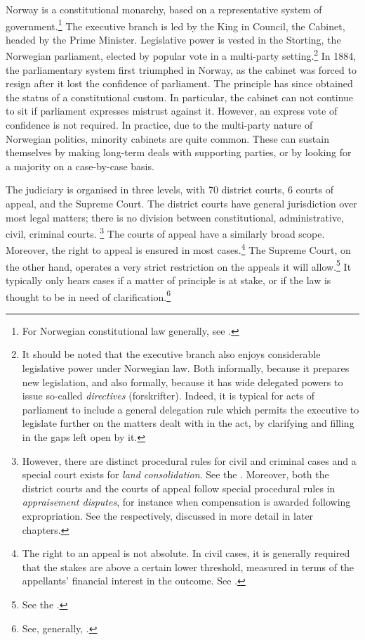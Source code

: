 Norway is a constitutional monarchy, based on a representative system of government.\footnote{For Norwegian constitutional law generally, see \cite{andenes06}.} The executive branch is led by the King in Council, the Cabinet, headed by the Prime Minister. Legislative power is vested in the Storting, the Norwegian parliament, elected by popular vote in a multi-party setting.\footnote{It should be noted that the executive branch also enjoys considerable legislative power under Norwegian law. Both informally, because it prepares new legislation, and also formally, because it has wide delegated powers to issue so-called {\it directives} (forskrifter). Indeed, it is typical for acts of parliament to include a general delegation rule which permits the executive to legislate further on the matters dealt with in the act, by clarifying and filling in the gaps left open by it.} In 1884, the parliamentary system first triumphed in Norway, as the cabinet was forced to resign after it lost the confidence of parliament. The principle has since obtained the status of a constitutional custom. In particular, the cabinet can not continue to sit if parliament expresses mistrust against it. However, an express vote of confidence is not required. In practice, due to the multi-party nature of Norwegian politics, minority cabinets are quite common. These can sustain themselves by making long-term deals with supporting parties, or by looking for a majority on a case-by-case basis.

The judiciary is organised in three levels, with 70 district courts, 6 courts of appeal, and the Supreme Court. The district courts have general jurisdiction over most legal matters; there is no division between constitutional, administrative, civil, criminal courts. \footnote{However, there are distinct procedural rules for civil and criminal cases and a special court exists for {\it land consolidation}. See the \cite{lca79}. Moreover, both the district courts and the courts of appeal follow special procedural rules in {\it appraisement disputes}, for instance when compensation is awarded following expropriation. See the \cite{aa17} respectively, discussed in more detail in later chapters.} The courts of appeal have a similarly broad scope. Moreover, the right to appeal is ensured in most cases.\footnote{The right to an appeal is not absolute. In civil cases, it is generally required that the stakes are above a certain lower threshold, measured in terms of the appellants' financial interest in the outcome. See \cite[29-13]{da05}.} The Supreme Court, on the other hand, operates a very strict restriction on the appeals it will allow.\footnote{See the \cite[30-4]{da05}.} It typically only hears cases if a matter of principle is at stake, or if the law is thought to be in need of clarification.\footnote{See, generally, \cite{skoghoy08}.}

